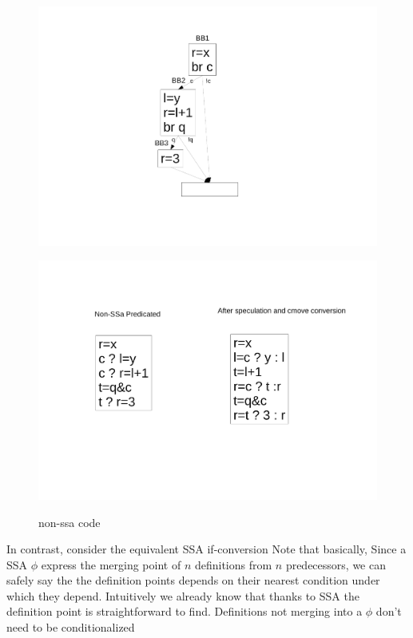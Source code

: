 \begin{figure}
\footnotesize
\begin{minipage}[b]{4cm}
\includegraphics[scale=0.2]{nested_0.pdf}
\label{fig:nest0}
\end{minipage}
\begin{minipage}[b]{4cm}
\includegraphics[scale=0.2]{nested_01.pdf}
\label{fig:nest1}
\end{minipage}
\caption{non-ssa code}
\end{figure}

In contrast, consider the equivalent SSA if-conversion 
Note that basically, Since a SSA $\phi$ express the merging point of $n$ definitions from $n$ predecessors, we can safely say the the definition points depends on their nearest condition under which they depend. Intuitively we already know that thanks to SSA the definition point is straightforward to find. Definitions not merging into a $\phi$ don't need to be conditionalized

